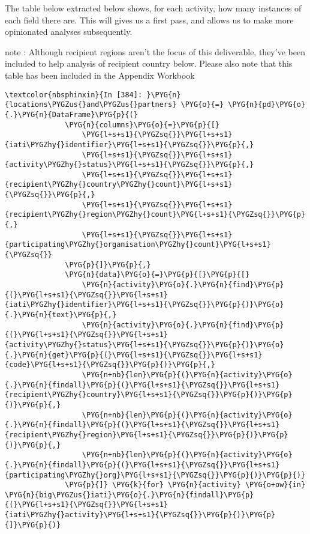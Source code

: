 \documentclass[letterpaper,10pt,english]{sphinxmanual}
\newenvironment{notice}{\begin{sphinxadmonition}}{\end{sphinxadmonition}}%
\begin{document}
The table below extracted below shows, for each activity, how many
instances of each field there are. This will gives us a first pass, and
allows us to make more opinionated analyses subsequently.

\begin{notice}{note}{}\unskip
{}: Although recipient regions aren't the focus of this
deliverable, they've been included to help analysis of recipient country
below. Please also note that this table has been included in the
Appendix Workbook
\end{notice}

\begin{Verbatim}[commandchars=\\\{\}]
\textcolor{nbsphinxin}{In [384]: }\PYG{n}{locations\PYGZus{}and\PYGZus{}partners} \PYG{o}{=} \PYG{n}{pd}\PYG{o}{.}\PYG{n}{DataFrame}\PYG{p}{(}
              \PYG{n}{columns}\PYG{o}{=}\PYG{p}{[}
                  \PYG{l+s+s1}{\PYGZsq{}}\PYG{l+s+s1}{iati\PYGZhy{}identifier}\PYG{l+s+s1}{\PYGZsq{}}\PYG{p}{,}
                  \PYG{l+s+s1}{\PYGZsq{}}\PYG{l+s+s1}{activity\PYGZhy{}status}\PYG{l+s+s1}{\PYGZsq{}}\PYG{p}{,}
                  \PYG{l+s+s1}{\PYGZsq{}}\PYG{l+s+s1}{recipient\PYGZhy{}country\PYGZhy{}count}\PYG{l+s+s1}{\PYGZsq{}}\PYG{p}{,}
                  \PYG{l+s+s1}{\PYGZsq{}}\PYG{l+s+s1}{recipient\PYGZhy{}region\PYGZhy{}count}\PYG{l+s+s1}{\PYGZsq{}}\PYG{p}{,}
                  \PYG{l+s+s1}{\PYGZsq{}}\PYG{l+s+s1}{participating\PYGZhy{}organisation\PYGZhy{}count}\PYG{l+s+s1}{\PYGZsq{}}
              \PYG{p}{]}\PYG{p}{,}
              \PYG{n}{data}\PYG{o}{=}\PYG{p}{[}\PYG{p}{[}
                  \PYG{n}{activity}\PYG{o}{.}\PYG{n}{find}\PYG{p}{(}\PYG{l+s+s1}{\PYGZsq{}}\PYG{l+s+s1}{iati\PYGZhy{}identifier}\PYG{l+s+s1}{\PYGZsq{}}\PYG{p}{)}\PYG{o}{.}\PYG{n}{text}\PYG{p}{,}
                  \PYG{n}{activity}\PYG{o}{.}\PYG{n}{find}\PYG{p}{(}\PYG{l+s+s1}{\PYGZsq{}}\PYG{l+s+s1}{activity\PYGZhy{}status}\PYG{l+s+s1}{\PYGZsq{}}\PYG{p}{)}\PYG{o}{.}\PYG{n}{get}\PYG{p}{(}\PYG{l+s+s1}{\PYGZsq{}}\PYG{l+s+s1}{code}\PYG{l+s+s1}{\PYGZsq{}}\PYG{p}{)}\PYG{p}{,}
                  \PYG{n+nb}{len}\PYG{p}{(}\PYG{n}{activity}\PYG{o}{.}\PYG{n}{findall}\PYG{p}{(}\PYG{l+s+s1}{\PYGZsq{}}\PYG{l+s+s1}{recipient\PYGZhy{}country}\PYG{l+s+s1}{\PYGZsq{}}\PYG{p}{)}\PYG{p}{)}\PYG{p}{,}
                  \PYG{n+nb}{len}\PYG{p}{(}\PYG{n}{activity}\PYG{o}{.}\PYG{n}{findall}\PYG{p}{(}\PYG{l+s+s1}{\PYGZsq{}}\PYG{l+s+s1}{recipient\PYGZhy{}region}\PYG{l+s+s1}{\PYGZsq{}}\PYG{p}{)}\PYG{p}{)}\PYG{p}{,}
                  \PYG{n+nb}{len}\PYG{p}{(}\PYG{n}{activity}\PYG{o}{.}\PYG{n}{findall}\PYG{p}{(}\PYG{l+s+s1}{\PYGZsq{}}\PYG{l+s+s1}{participating\PYGZhy{}org}\PYG{l+s+s1}{\PYGZsq{}}\PYG{p}{)}\PYG{p}{)}
              \PYG{p}{]} \PYG{k}{for} \PYG{n}{activity} \PYG{o+ow}{in} \PYG{n}{big\PYGZus{}iati}\PYG{o}{.}\PYG{n}{findall}\PYG{p}{(}\PYG{l+s+s1}{\PYGZsq{}}\PYG{l+s+s1}{iati\PYGZhy{}activity}\PYG{l+s+s1}{\PYGZsq{}}\PYG{p}{)}\PYG{p}{]}\PYG{p}{)}
          

\end{Verbatim}
\end{document}
